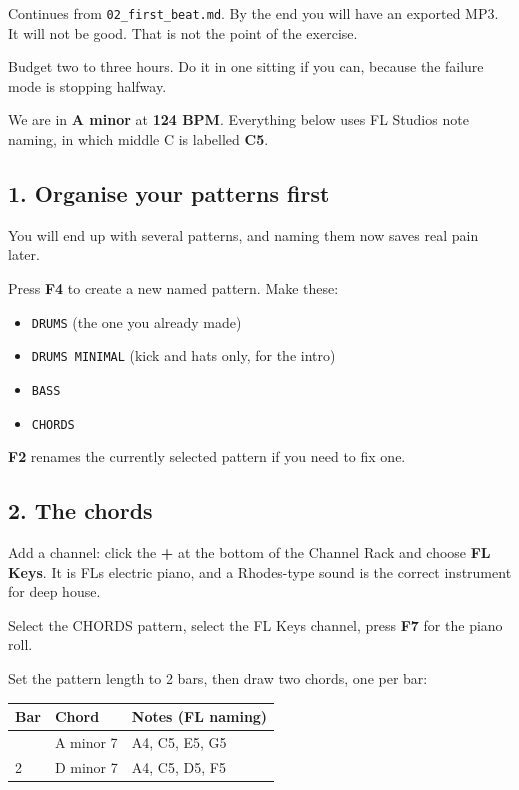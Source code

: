 Continues from \texttt{02\_first\_beat.md}. By the end you will have an exported MP3. It will not be
good. That is not the point of the exercise.

Budget two to three hours. Do it in one sitting if you can, because the failure mode is
stopping halfway.

We are in \textbf{A minor} at \textbf{124 BPM}. Everything below uses FL Studio\textquotesingle s note naming, in which
middle C is labelled \textbf{C5}.

\subsection{1. Organise your patterns first}\label{fl03_first_track-1-organise-your-patterns-first}

You will end up with several patterns, and naming them now saves real pain later.

Press \textbf{F4} to create a new named pattern. Make these:

\begin{itemize}
\tightlist
\item
  \texttt{DRUMS} (the one you already made)
\item
  \texttt{DRUMS\ MINIMAL} (kick and hats only, for the intro)
\item
  \texttt{BASS}
\item
  \texttt{CHORDS}
\end{itemize}

\textbf{F2} renames the currently selected pattern if you need to fix one.

\subsection{2. The chords}\label{fl03_first_track-2-the-chords}

Add a channel: click the \textbf{+} at the bottom of the Channel Rack and choose \textbf{FL Keys}. It
is FL\textquotesingle s electric piano, and a Rhodes-type sound is the correct instrument for deep house.

Select the CHORDS pattern, select the FL Keys channel, press \textbf{F7} for the piano roll.

Set the pattern length to 2 bars, then draw two chords, one per bar:

{\def\LTcaptype{none} %
\begin{longtable}[]{@{}lll@{}}
\toprule\noalign{}
Bar & Chord & Notes (FL naming) \\
\midrule\noalign{}
\endhead
\bottomrule\noalign{}
\endlastfoot
1 & A minor 7 & A4, C5, E5, G5 \\
2 & D minor 7 & A4, C5, D5, F5 \\
\end{longtable}
}

